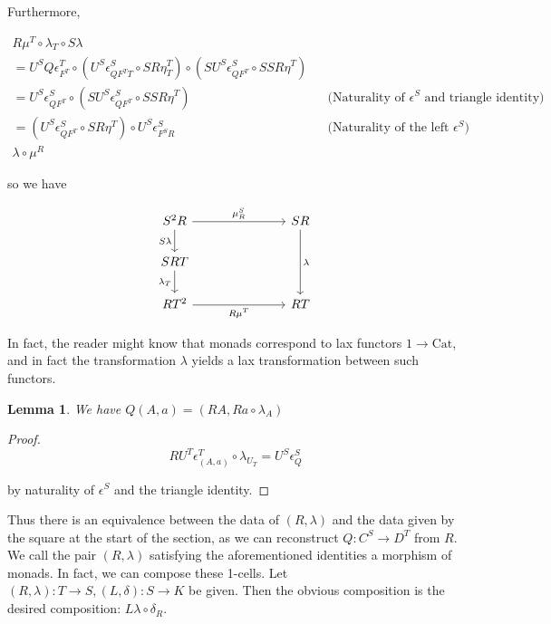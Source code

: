 \documentclass[10pt, oneside]{article}
\newtheorem{lemma}[theorem]{Lemma}
\begin{document}
Furthermore,

\begin{align}
    R \mu^T \circ \lambda_T \circ S \lambda
    \\ = U^S Q \epsilon^T_{F^T} \circ (U^S \epsilon^S_{Q F^T T} \circ S R \eta^T_T) \circ (S U^S \epsilon^S_{Q F^T} \circ S S R \eta^T)
    \\ = U^S \epsilon^S_{Q F^T} \circ (S U^S \epsilon^S_{Q F^T} \circ S S R \eta^T) && \text{(Naturality of $\epsilon^S$ and triangle identity)}
    \\ = (U^S \epsilon^S_{Q F^T} \circ S R \eta^T) \circ U^S \epsilon^S_{F^S R} && \text{(Naturality of the left $\epsilon^S$)}
    \\ \lambda \circ \mu^R
\end{align}

\noindent so we have

\[\begin{tikzcd}[ampersand replacement=\&]
	{S^2 R} \&\&\& SR \\
	SRT \\
	{RT^2} \&\&\& RT
	\arrow["{\mu^S_R}", from=1-1, to=1-4]
	\arrow["\lambda", from=1-4, to=3-4]
	\arrow["{S \lambda}"', from=1-1, to=2-1]
	\arrow["{\lambda_T}"', from=2-1, to=3-1]
	\arrow["{R \mu^T}"', from=3-1, to=3-4]
\end{tikzcd}\]

In fact, the reader might know that monads correspond to lax functors $1 \to \mathrm{Cat}$, and in fact the transformation $\lambda$ yields a lax transformation between such functors.

\begin{lemma}
    We have $Q(A, a) = (RA, Ra \circ \lambda_A)$
\end{lemma}
\begin{proof}
    $$R U^T \epsilon^T_{(A, a)} \circ \lambda_{U_T} = U^S \epsilon^S_{Q}$$

    \noindent by naturality of $\epsilon^S$ and the triangle identity.
\end{proof}

Thus there is an equivalence between the data of $(R, \lambda)$ and the data given by the square at the start of the section, as we can reconstruct $Q: C^S \to D^T$ from $R$. We call the pair $(R, \lambda)$ satisfying the aforementioned identities a morphism of monads. In fact, we can compose these 1-cells. Let $(R, \lambda): T \to S,  (L, \delta): S \to K$ be given. Then the obvious composition is the desired composition: $L \lambda \circ \delta_R$.
\end{document}
